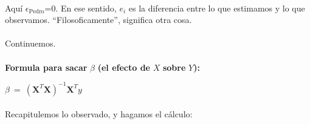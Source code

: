 \documentclass[10pt]{article}
\begin{document}
\paragraph{}Aqu\'i $\displaystyle \epsilon _{\text{Pedro}}$=0. En ese sentido, $\displaystyle e_{i}$ es la diferencia entre lo que estimamos y lo que observamos. ``Filosoficamente'', significa otra cosa.



\paragraph{}Continuemos.





\paragraph{}{\Large \textbf{Formula para sacar }$\displaystyle \beta $\textbf{ (el efecto de }$\displaystyle X$\textbf{ sobre }$\displaystyle Y$\textbf{):}}



$\displaystyle \beta \ =\ \left( \boldsymbol{X}^{T} \boldsymbol{X}\right)^{-1} \boldsymbol{X}^{T} y$



\paragraph{}Recapitulemos lo observado, y hagamos el c\'alculo:
\end{document}
